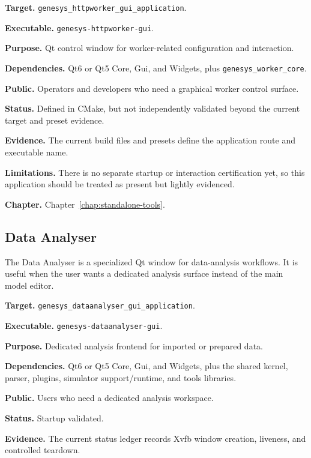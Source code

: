 \noindent\textbf{Target.} \texttt{genesys\_httpworker\_gui\_application}.

\noindent\textbf{Executable.} \texttt{genesys-httpworker-gui}.

\noindent\textbf{Purpose.} Qt control window for worker-related configuration and interaction.

\noindent\textbf{Dependencies.} Qt6 or Qt5 Core, Gui, and Widgets, plus \texttt{genesys\_worker\_core}.

\noindent\textbf{Public.} Operators and developers who need a graphical worker control surface.

\noindent\textbf{Status.} Defined in CMake, but not independently validated beyond the current target and preset evidence.

\noindent\textbf{Evidence.} The current build files and presets define the application route and executable name.

\noindent\textbf{Limitations.} There is no separate startup or interaction certification yet, so this application should be treated as present but lightly evidenced.

\noindent\textbf{Chapter.} Chapter~\ref{chap:standalone-tools}.

\subsection{Data Analyser}
\label{subsec:application-overview-data-analyser}

The Data Analyser is a specialized Qt window for data-analysis workflows. It
is useful when the user wants a dedicated analysis surface instead of the main
model editor.

\noindent\textbf{Target.} \texttt{genesys\_dataanalyser\_gui\_application}.

\noindent\textbf{Executable.} \texttt{genesys-dataanalyser-gui}.

\noindent\textbf{Purpose.} Dedicated analysis frontend for imported or prepared data.

\noindent\textbf{Dependencies.} Qt6 or Qt5 Core, Gui, and Widgets, plus the shared kernel, parser, plugins, simulator support/runtime, and tools libraries.

\noindent\textbf{Public.} Users who need a dedicated analysis workspace.

\noindent\textbf{Status.} Startup validated.

\noindent\textbf{Evidence.} The current status ledger records Xvfb window creation, liveness, and controlled teardown.

